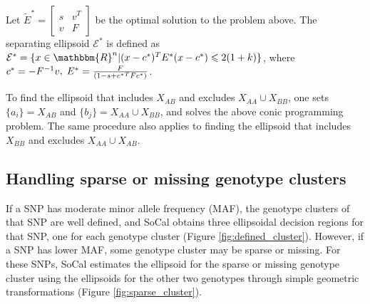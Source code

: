 \documentclass{scrartcl}
\begin{document}
\par
Let 
$\tilde{E}^{*}=\left[
    \begin{array}{cc}
    s & v^T \\
    v & F
    \end{array}
\right]$
be the optimal solution to the problem above.
The separating ellipsoid $\mathcal{E}^{*}$ is defined as
$\mathcal{E}^{*}=
\{x \in \mathbbm{R}^{n}|(x-c^{*})^TE^{*}(x-c^{*})\leqslant2(1+k)\}$,
where $c^{*}=-F^{-1}v,\;E^{*}={{F} \over {(1-s+{c^{*}}^TF{c^{*}})}}$.

\par
To find the ellipsoid that includes $X_{AB}$ and excludes
$X_{AA} \cup X_{BB}$, one sets $\{a_i\}=X_{AB}$ and
$\{b_j\}=X_{AA} \cup X_{BB}$, and solves the above conic programming problem.
The same procedure also applies to finding the ellipsoid that includes $X_{BB}$
and excludes $X_{AA} \cup X_{AB}$.

\subsection{Handling sparse or missing genotype clusters}
\par
If a SNP has moderate minor allele frequency (MAF), the genotype clusters of
that SNP are well defined, and SoCal obtains three ellipsoidal decision
regions for that SNP, one for each genotype cluster
(Figure \ref{fig:defined_cluster}).
However, if a SNP has lower MAF, some genotype cluster may be sparse
or missing.
For these SNPs, SoCal estimates the ellipsoid for the sparse or missing
genotype cluster using the ellipsoids for the other two genotypes through
simple geometric transformations (Figure \ref{fig:sparse_cluster}).
\end{document}
